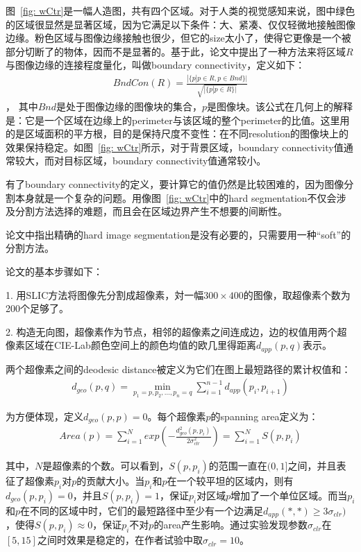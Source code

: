 \documentclass[12pt]{article}
\begin{document}
图~\ref{fig: wCtr}是一幅人造图，共有四个区域。对于人类的视觉感知来说，图中绿色的区域很显然是显著区域，因为它满足以下条件：大、紧凑、仅仅轻微地接触图像边缘。粉色区域与图像边缘接触也很少，但它的size太小了，使得它更像是一个被部分切断了的物体，因而不是显著的。基于此，论文中提出了一种方法来将区域$R$与图像边缘的连接程度量化，叫做boundary connectivity，定义如下：
\begin{align}
BndCon(R) = \frac{|\{p|p \in R, p \in Bnd\}|}{\sqrt{|\{p|p \in R\}|}}
\end{align}，
其中$Bnd$是处于图像边缘的图像块的集合，$p$是图像块。该公式在几何上的解释是：它是一个区域在边缘上的perimeter与该区域的整个perimeter的比值。这里用的是区域面积的平方根，目的是保持尺度不变性：在不同resolution的图像块上的效果保持稳定。如图~\ref{fig: wCtr}所示，对于背景区域，boundary connectivity值通常较大，而对目标区域，boundary connectivity值通常较小。

有了boundary connectivity的定义，要计算它的值仍然是比较困难的，因为图像分割本身就是一个复杂的问题。用像图~\ref{fig: wCtr}中的hard segmentation不仅会涉及分割方法选择的难题，而且会在区域边界产生不想要的间断性。

论文中指出精确的hard image segmentation是没有必要的，只需要用一种“soft”的分割方法。

论文的基本步骤如下：

1. 用SLIC方法将图像先分割成超像素，対一幅$300 \times 400$的图像，取超像素个数为200个足够了。

2. 构造无向图，超像素作为节点，相邻的超像素之间连成边，边的权值用两个超像素区域在CIE-Lab颜色空间上的颜色均值的欧几里得距离$d_{app}(p, q)$表示。

两个超像素之间的deodesic distance被定义为它们在图上最短路径的累计权值和：
\begin{align}
d_{geo}(p, q) = \min_{p_1=p, p_2, \ldots, p_n=q}\sum_{i=1}^{n-1}d_{app}(p_i, p_{i+1})
\end{align}

为方便体现，定义$d_{geo}(p, p) = 0$。每个超像素$p$的spanning area定义为：
\begin{align}
Area(p) = \sum_{i=1}^N exp(-\frac{d_{geo}^2(p, p_i)}{2\sigma_{clr}^2})=\sum_{i=1}^N S(p, p_i)
\end{align}

其中，$N$是超像素的个数。可以看到，$S(p, p_i)$的范围一直在$(0, 1]$之间，并且表征了超像素$p_i$对$p$的贡献大小。当$p_i$和$p$在一个较平坦的区域内，则有$d_{geo}(p, p_i) = 0$，并且$S(p, p_i) =1$，保证$p_i$对区域$p$增加了一个单位区域。而当$p_i$和$p$在不同的区域中时，它们的最短路径中至少有一个边满足$d_{app}(*, *)\ge 3\sigma_{clr})$，使得$S(p, p_i)\approx0$，保证$p_i$不对$p$的area产生影响。通过实验发现参数$\sigma_{clr}$在$[5,15]$之间时效果是稳定的，在作者试验中取$\sigma_{clr}=10$。
\end{document}

